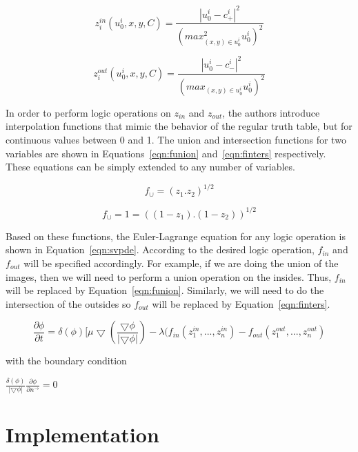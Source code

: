 \documentclass[10pt,journal,letterpaper,compsoc]{IEEEtran}
\begin{document}
\begin{equation}
\label{eqn:zin}
z_{i}^{in}(u_{0}^{i},x,y,C) = \frac{|u_{0}^{i} - c_{+}^i|^2}{(max^{2}_{(x,y) \in u_{0}^{i}} u_{0}^i)^2}
\end{equation}

\begin{equation}
\label{eqn:zout}
z_{i}^{out}(u_{0}^{i},x,y,C) = \frac{|u_{0}^{i} - c_{-}^i|^2}{(max_{(x,y) \in u_{0}^{i}} u_{0}^i)^2}
\end{equation}

In order to perform logic operations on $z_{in}$ and $z_{out}$, the authors introduce interpolation functions that mimic the behavior of the regular truth
table, but for continuous values between 0 and 1. The union and intersection functions for two variables are shown in Equations~\ref{eqn:funion}
and~\ref{eqn:finters} respectively. These equations can be simply extended to any number of variables.

\begin{equation}
\label{eqn:funion}
f_{\cup} = (z_{1} . z_{2})^{1/2}
\end{equation}

\begin{equation}
\label{eqn:finters}
f_{\cup} = 1 = ((1 - z_{1}) .(1-  z_{2}))^{1/2}
\end{equation}

Based on these functions, the Euler-Lagrange equation for any logic operation is shown in Equation~\ref{eqn:svpde}. According to the desired logic operation,
$f_{in}$ and $f_{out}$ will be specified accordingly. For example, if we are doing the union of the images, then we will need to perform a union operation on
the insides. Thus, $f_{in}$ will be replaced by Equation~\ref{eqn:funion}. Similarly, we will need to do the intersection of the outsides so $f_{out}$ will be
replaced by Equation~\ref{eqn:finters}.

\begin{equation}
\label{eqn:svpde}
\frac{\partial{\phi}}{\partial{t}} = \delta(\phi)[\mu\bigtriangledown(\frac{\bigtriangledown \phi}{|\bigtriangledown \phi|})  - \lambda(f_{in}(z_{1}^{in}, ...,
z_{n}^{in}) - f_{out}(z_{1}^{out}, ..., z_{n}^{out})
\end{equation}

with the boundary condition

$\frac{\delta(\phi)}{|\bigtriangledown\phi|}\frac{\partial\phi}{\partial n^{\rightarrow}} = 0$

\section{Implementation}
\label{sec:implementation}
\end{document}

